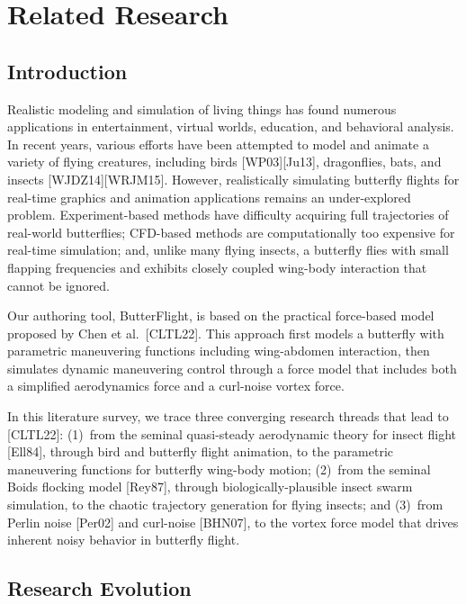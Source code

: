 \documentclass[12pt]{article}
\begin{document}
\section{Related Research}

\subsection*{Introduction}

Realistic modeling and simulation of living things has found numerous applications in
entertainment, virtual worlds, education, and behavioral analysis. In recent years,
various efforts have been attempted to model and animate a variety of flying creatures,
including birds [WP03][Ju13], dragonflies, bats, and insects [WJDZ14][WRJM15].
However, realistically simulating butterfly flights for real-time graphics and animation
applications remains an under-explored problem. Experiment-based methods have
difficulty acquiring full trajectories of real-world butterflies; CFD-based methods are
computationally too expensive for real-time simulation; and, unlike many flying insects,
a butterfly flies with small flapping frequencies and exhibits closely coupled
wing-body interaction that cannot be ignored.

Our authoring tool, ButterFlight, is based on the practical force-based model
proposed by Chen et al.\ [CLTL22]. This approach first models a butterfly with
parametric maneuvering functions including wing-abdomen interaction, then simulates
dynamic maneuvering control through a force model that includes both a simplified
aerodynamics force and a curl-noise vortex force.

In this literature survey, we trace three converging research threads that lead to
[CLTL22]: (1)~from the seminal quasi-steady aerodynamic theory for insect flight
[Ell84], through bird and butterfly flight animation, to the parametric maneuvering
functions for butterfly wing-body motion; (2)~from the seminal Boids flocking model
[Rey87], through biologically-plausible insect swarm simulation, to the chaotic
trajectory generation for flying insects; and (3)~from Perlin noise [Per02] and
curl-noise [BHN07], to the vortex force model that drives inherent noisy behavior
in butterfly flight.

\subsection*{Research Evolution}
\end{document}
